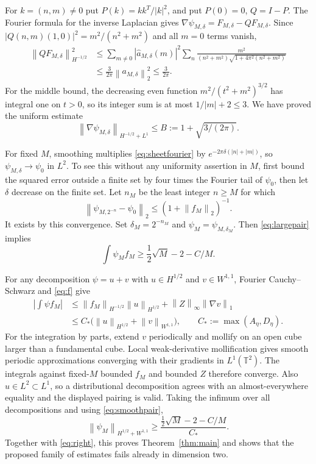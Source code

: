 \documentclass[11pt]{article}
\newcommand{\T}{\mathbb T}
\newcommand{\norm}[1]{\left\lVert#1\right\rVert}
\begin{document}
For $k=(n,m)\ne0$ put $P(k)=kk^T/|k|^2$, and put $P(0)=0$, $Q=I-P$.
The Fourier formula for the inverse Laplacian gives
$\nabla\psi_{M,\delta}=F_{M,\delta}-QF_{M,\delta}$.
Since $|Q(n,m)(1,0)|^2=m^2/(n^2+m^2)$ and all $m=0$ terms vanish,
\begin{align*}
 \norm{QF_{M,\delta}}_{H^{-1/2}}^2
 &\leq\sum_{m\ne0}|\widehat a_{M,\delta}(m)|^2
     \sum_n\frac{m^2}{(n^2+m^2)\sqrt{1+4\pi^2(n^2+m^2)}}\\
 &\leq\frac3{2\pi}\norm{a_{M,\delta}}_2^2\leq\frac3{2\pi}.
\end{align*}
For the middle bound, the decreasing even function
$m^2/(t^2+m^2)^{3/2}$ has integral one on $t>0$, so its integer sum
is at most $1/|m|+2\leq3$. We have proved the uniform estimate
\begin{equation}\label{eq:right}
 \norm{\nabla\psi_{M,\delta}}_{H^{-1/2}+L^1}
       \leq B:=1+\sqrt{3/(2\pi)}.
\end{equation}

For fixed $M$, smoothing multiplies \eqref{eq:sheetfourier} by
$e^{-2\pi\delta(|n|+|m|)}$, so $\psi_{M,\delta}\to\psi_0$ in $L^2$.
To see this without any uniformity assertion in $M$, first bound the
squared error outside a finite set by four times the Fourier tail of
$\psi_0$, then let $\delta$ decrease on the finite set.
Let $n_M$ be the least integer $n\geq M$ for which
\[
 \norm{\psi_{M,2^{-n}}-\psi_0}_2\leq(1+\norm{f_M}_2)^{-1}.
\]
It exists by this convergence. Set $\delta_M=2^{-n_M}$ and
$\psi_M=\psi_{M,\delta_M}$. Then \eqref{eq:largepair} implies
\begin{equation}\label{eq:smoothpair}
 \int\psi_Mf_M\geq\frac12\sqrt M-2-C/M.
\end{equation}

For any decomposition $\psi=u+v$ with $u\in H^{1/2}$ and
$v\in W^{1,1}$, Fourier Cauchy--Schwarz and \eqref{eq:f} give
\begin{align*}
 \left|\int\psi f_M\right|
 &\leq\norm{f_M}_{H^{-1/2}}\norm u_{H^{1/2}}
              +\norm Z_\infty\norm{\nabla v}_1\\
 &\leq C_*\bigl(\norm u_{H^{1/2}}+\norm v_{W^{1,1}}\bigr),
 \qquad C_*:=\max(A_\eta,D_\eta).
\end{align*}
For the integration by parts, extend $v$ periodically and mollify on an
open cube larger than a fundamental cube. Local weak-derivative
mollification \cite[Theorem~3.19]{Hunter} gives smooth periodic approximations
converging with their gradients in $L^1(\T^2)$.
The integrals against fixed-$M$ bounded $f_M$ and bounded $Z$ therefore
converge. Also $u\in L^2\subset L^1$, so a distributional decomposition
agrees with an almost-everywhere equality and the displayed pairing is valid.
Taking the infimum over all decompositions and using \eqref{eq:smoothpair},
\[
 \norm{\psi_M}_{H^{1/2}+W^{1,1}}
       \geq\frac{\frac12\sqrt M-2-C/M}{C_*}.
\]
Together with \eqref{eq:right}, this proves Theorem~\ref{thm:main} and
shows that the proposed family of estimates fails already in dimension two.
\end{document}
